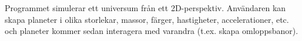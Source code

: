 Programmet simulerar ett universum från ett 2D-perspektiv.
Användaren kan skapa planeter i olika
storlekar, massor, färger, hastigheter, accelerationer, etc.
och planeter kommer sedan interagera med varandra (t.ex. skapa omloppsbanor).


